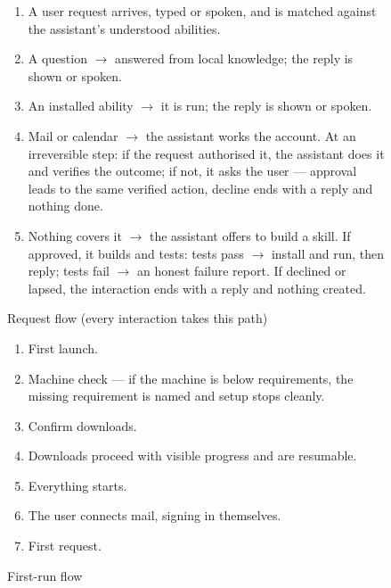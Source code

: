 \documentclass[12pt]{article}
\begin{document}
\begin{figure}[htbp]
  \centering

  \medskip
  \begin{minipage}{0.9\textwidth}
    \small
    \begin{enumerate}[itemsep=1pt]
      \item A user request arrives, typed or spoken, and is matched against
        the assistant's understood abilities.
      \item A question $\rightarrow$ answered from local knowledge; the
        reply is shown or spoken.
      \item An installed ability $\rightarrow$ it is run; the reply is shown
        or spoken.
      \item Mail or calendar $\rightarrow$ the assistant works the account.
        At an irreversible step: if the request authorised it, the assistant
        does it and verifies the outcome; if not, it asks the user ---
        approval leads to the same verified action, decline ends with a
        reply and nothing done.
      \item Nothing covers it $\rightarrow$ the assistant offers to build a
        skill. If approved, it builds and tests: tests pass $\rightarrow$
        install and run, then reply; tests fail $\rightarrow$ an honest
        failure report. If declined or lapsed, the interaction ends with a
        reply and nothing created.
    \end{enumerate}
  \end{minipage}
  \caption{Request flow (every interaction takes this path)}
  \label{fig:request-flow}
\end{figure}

\begin{figure}[htbp]
  \centering

  \medskip
  \begin{minipage}{0.9\textwidth}
    \small
    \begin{enumerate}[itemsep=1pt]
      \item First launch.
      \item Machine check --- if the machine is below requirements, the
        missing requirement is named and setup stops cleanly.
      \item Confirm downloads.
      \item Downloads proceed with visible progress and are resumable.
      \item Everything starts.
      \item The user connects mail, signing in themselves.
      \item First request.
    \end{enumerate}
  \end{minipage}
  \caption{First-run flow}
  \label{fig:first-run-flow}
\end{figure}
\end{document}
